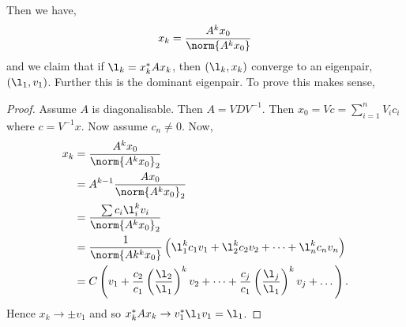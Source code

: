 \noindent
Then we have,
$$ x_k = \frac{A^k x_0}{\norm{A^k x_0}} $$
and we claim that if $\l_k = x_k^* A x_k$, then $(\l_k, x_k)$ converge to an eigenpair, $(\l_1, v_1)$. Further this is the dominant eigenpair. To prove this makes sense,
\begin{proof}
  Assume $A$ is diagonalisable. Then $A = VDV^{-1}$. Then $x_0 = Vc = \sum_{i=1}^n V_ic_i$ where $c = V^{-1}x$. Now assume $c_n \ne 0$. Now,
  \begin{align*}
    x_k &= \frac{A^kx_0}{\norm{A^k x_0}_2}\\
    &= A^{k-1} \frac{Ax_0}{\norm{A^kx_0}_2}\\
    &= \frac{\sum c_i\l_i^k v_i}{\norm{A^k x_0}_2} \\
    &= \frac{1}{\norm{Ak^k x_0}} \left(\l_1^k c_1 v_1 + \l_2^k c_2v_2 + \dots + \l_n^k c_n v_n \right) \\
    &= C \left(v_1 + \frac{c_2}{c_1} \left(\frac{\l_2}{\l_1} \right)^k v_2 + \dots + \frac{c_j}{c_1} \left( \frac{\l_j}{\l_1} \right)^k v_j + \dots  \right).
  \end{align*}
  Hence $x_k \to \pm v_1$ and so $x_k^* A x_k \to v_1^* \l_1 v_1 = \l_1$. 
\end{proof}